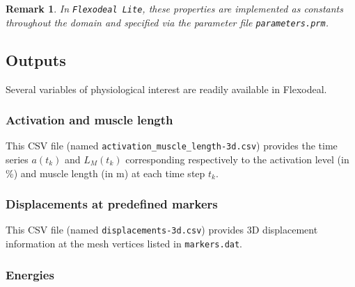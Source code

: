 \documentclass{sfuthesis}
\numberwithin{equation}{section}
\numberwithin{figure}{chapter}
\numberwithin{table}{chapter}
\newtheorem{remark}[theorem]{Remark}
\theoremstyle{definition}
\begin{document}
\begin{remark}
    In \texttt{Flexodeal Lite}, these properties are implemented as constants throughout the domain and specified via the parameter file \texttt{parameters.prm}.
\end{remark}

\subsection{Outputs} \label{sec:flexodeal_outputs}

Several variables of physiological interest are readily available in Flexodeal.

\subsubsection{Activation and muscle length}

This CSV file (named \texttt{activation\_muscle\_length-3d.csv}) provides the time series $a(t_k)$ and $L_M(t_k)$ corresponding respectively to the activation level (in \%) and muscle length (in m) at each time step $t_k$.

\subsubsection{Displacements at predefined markers}

This CSV file (named \texttt{displacements-3d.csv}) provides 3D displacement information at the mesh vertices listed in \texttt{markers.dat}.

\subsubsection{Energies}
\end{document}
